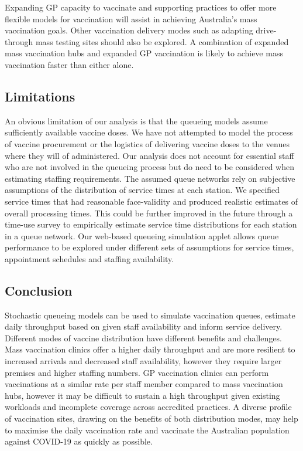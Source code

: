 \documentclass{article}
\begin{document}
Expanding GP capacity to vaccinate and supporting practices to offer
more flexible models for vaccination will assist in achieving
Australia's mass vaccination goals. Other vaccination delivery modes
such as adapting drive-through mass testing sites should also be
explored. A combination of expanded mass vaccination hubs and expanded
GP vaccination is likely to achieve mass vaccination faster than either
alone.

\hypertarget{limitations}{%
\subsection{Limitations}\label{limitations}}

An obvious limitation of our analysis is that the queueing models assume
sufficiently available vaccine doses. We have not attempted to model the
process of vaccine procurement or the logistics of delivering vaccine
doses to the venues where they will of administered. Our analysis does
not account for essential staff who are not involved in the queueing
process but do need to be considered when estimating staffing
requirements. The assumed queue networks rely on subjective assumptions
of the distribution of service times at each station. We specified
service times that had reasonable face-validity and produced realistic
estimates of overall processing times. This could be further improved in
the future through a time-use survey to empirically estimate service
time distributions for each station in a queue network. Our web-based
queueing simulation applet allows queue performance to be explored under
different sets of assumptions for service times, appointment schedules
and staffing availability.

\hypertarget{conclusion}{%
\subsection{Conclusion}\label{conclusion}}

Stochastic queueing models can be used to simulate vaccination queues,
estimate daily throughput based on given staff availability and inform
service delivery. Different modes of vaccine distribution have different
benefits and challenges. Mass vaccination clinics offer a higher daily
throughput and are more resilient to increased arrivals and decreased
staff availability, however they require larger premises and higher
staffing numbers. GP vaccination clinics can perform vaccinations at a
similar rate per staff member compared to mass vaccination hubs, however
it may be difficult to sustain a high throughput given existing
workloads and incomplete coverage across accredited practices. A diverse
profile of vaccination sites, drawing on the benefits of both
distribution modes, may help to maximise the daily vaccination rate and
vaccinate the Australian population against COVID-19 as quickly as
possible.
\end{document}
